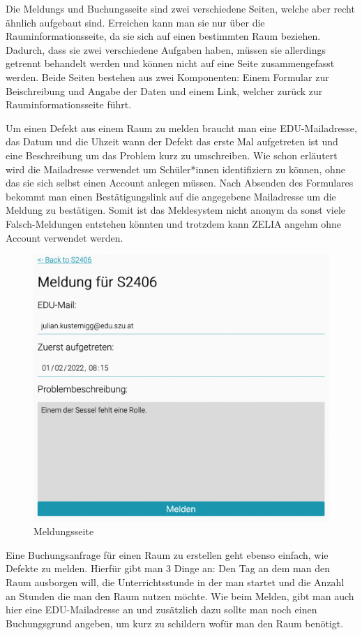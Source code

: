 
Die Meldungs und Buchungsseite sind zwei verschiedene Seiten, welche aber recht ähnlich aufgebaut sind. Erreichen kann man sie nur über die Rauminformationsseite, da sie sich auf einen bestimmten Raum beziehen. Dadurch, dass sie zwei verschiedene Aufgaben haben, müssen sie allerdings getrennt behandelt werden und können nicht auf eine Seite zusammengefasst werden. Beide Seiten bestehen aus zwei Komponenten: Einem Formular zur Beischreibung und Angabe der Daten und einem Link, welcher zurück zur Rauminformationsseite führt.
  

Um einen Defekt aus einem Raum zu melden braucht man eine EDU-Mailadresse, das Datum und die Uhzeit wann der Defekt das erste Mal aufgetreten ist und eine Beschreibung um das Problem kurz zu umschreiben. Wie schon erläutert wird die Mailadresse verwendet um Schüler*innen identifiziern zu können, ohne das sie sich selbst einen Account anlegen müssen. Nach Absenden des Formulares bekommt man einen Bestätigungslink auf die angegebene Mailadresse um die Meldung zu bestätigen. Somit ist das Meldesystem nicht anonym da sonst viele Falsch-Meldungen entstehen könnten und trotzdem kann ZELIA angehm ohne Account verwendet werden. 

\begin{figure}[H]
    \centering
    \includegraphics[width=120mm]{media/WebComponents/Meldungsseite_light.png}
    \caption{Meldungsseite}
\end{figure}

Eine Buchungsanfrage für einen Raum zu erstellen geht ebenso einfach, wie Defekte zu melden. Hierfür gibt man 3 Dinge an: Den Tag an dem man den Raum ausborgen will, die Unterrichtsstunde in der man startet und die Anzahl an Stunden die man den Raum nutzen möchte. Wie beim Melden, gibt man auch hier eine EDU-Mailadresse an und zusätzlich dazu sollte man noch einen Buchungsgrund angeben, um kurz zu schildern wofür man den Raum benötigt.

